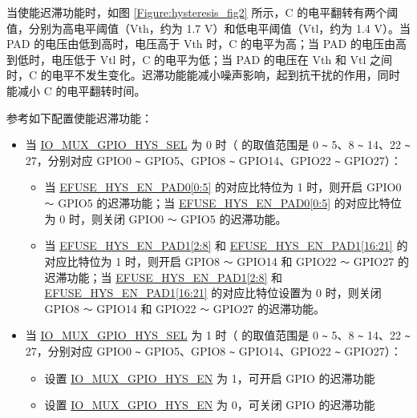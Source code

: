 \documentclass[main\_\_CN.tex]{subfiles}
\begin{document}
当使能迟滞功能时，如图 \ref{Figure:hysteresis_fig2} 所示，C 的电平翻转有两个阈值，分别为高电平阈值（Vth，约为 1.7 V）和低电平阈值（Vtl，约为 1.4 V）。当 PAD 的电压由低到高时，电压高于 Vth 时，C 的电平为高；当 PAD 的电压由高到低时，电压低于 Vtl 时，C 的电平为低；当 PAD 的电压在 Vth 和 Vtl 之间时，C 的电平不发生变化。迟滞功能能减小噪声影响，起到抗干扰的作用，同时能减小 C 的电平翻转时间。

参考如下配置使能迟滞功能：


\begin{itemize}
    \item 当 \hyperref[fielddesc:IOMUXGPIONHYSSEL]{IO\_MUX\_GPIO\_HYS\_SEL} 为 0 时（  的取值范围是 0 \verb+~+ 5、8 \verb+~+ 14、22 \verb+~+ 27，分别对应 GPIO0 \verb+~+ GPIO5、GPIO8 \verb+~+ GPIO14、GPIO22 \verb+~+ GPIO27）：
    \begin{itemize}
        \item 当 \hyperref[fielddesc:EFUSEHYSENPAD0]{EFUSE\_HYS\_EN\_PAD0[0:5]} 的对应比特位为 1 时，则开启 GPIO0  \verb+～+ GPIO5 的迟滞功能；当 \hyperref[fielddesc:EFUSEHYSENPAD0]{EFUSE\_HYS\_EN\_PAD0[0:5]} 的对应比特位为 0 时，则关闭 GPIO0  \verb+～+ GPIO5 的迟滞功能。
        \item 当 \hyperref[fielddesc:EFUSEHYSENPAD1]{EFUSE\_HYS\_EN\_PAD1[2:8]} 和 \hyperref[fielddesc:EFUSEHYSENPAD1]{EFUSE\_HYS\_EN\_PAD1[16:21]} 的对应比特位为 1 时，则开启 GPIO8  \verb+～+ GPIO14 和 GPIO22  \verb+～+ GPIO27 的迟滞功能；当 \hyperref[fielddesc:EFUSEHYSENPAD1]{EFUSE\_HYS\_EN\_PAD1[2:8]} 和 \hyperref[fielddesc:EFUSEHYSENPAD1]{EFUSE\_HYS\_EN\_PAD1[16:21]} 的对应比特位设置为 0 时，则关闭 GPIO8  \verb+～+ GPIO14 和 GPIO22  \verb+～+ GPIO27 的迟滞功能。
    \end{itemize}
    \item 当 \hyperref[fielddesc:IOMUXGPIONHYSSEL]{IO\_MUX\_GPIO\_HYS\_SEL} 为 1 时（ 的取值范围是 0 \verb+~+ 5、8 \verb+~+ 14、22 \verb+~+ 27，分别对应 GPIO0 \verb+~+ GPIO5、GPIO8 \verb+~+ GPIO14、GPIO22 \verb+~+ GPIO27）：
    \begin{itemize}
        \item 设置 \hyperref[fielddesc:IOMUXGPIONHYSEN]{IO\_MUX\_GPIO\_HYS\_EN} 为 1，可开启 GPIO 的迟滞功能
        \item 设置 \hyperref[fielddesc:IOMUXGPIONHYSEN]{IO\_MUX\_GPIO\_HYS\_EN} 为 0，可关闭 GPIO 的迟滞功能
    \end{itemize}
\end{itemize}
\end{document}
